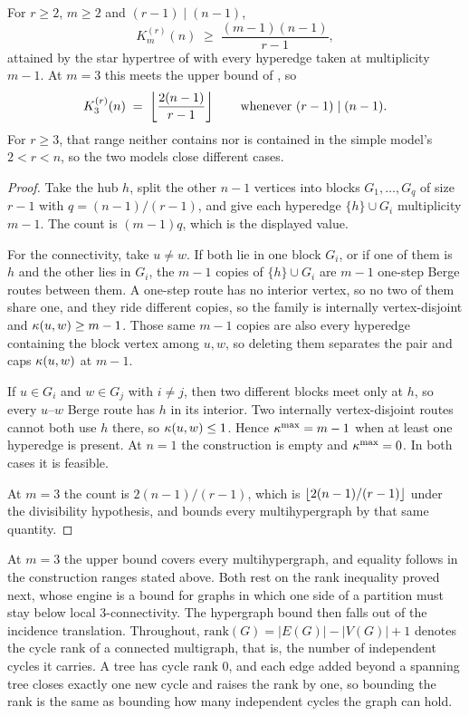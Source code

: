 \begin{proposition}\label{prop:hyper-vertex-lower-multi}
For $r \ge 2$, $m \ge 2$ and $(r-1) \mid (n-1)$,
\[
    K_m^{(r)}(n) \;\ge\; \frac{(m-1)(n-1)}{r-1},
\]
attained by the star hypertree of  with every hyperedge
taken at multiplicity $m-1$. At $m = 3$ this meets the upper bound of
, so
\[
    K_3^{(r)}(n) \;=\; \left\lfloor \frac{2(n-1)}{r-1} \right\rfloor
    \qquad\text{whenever } (r-1) \mid (n-1).
\]
For $r\ge3$, that range neither contains nor is contained in the simple model's
$2 < r < n$, so the two models close different cases.
\end{proposition}

\begin{proof}
Take the hub $h$, split the other $n-1$ vertices into blocks $G_1, \dots, G_q$ of
size $r-1$ with $q = (n-1)/(r-1)$, and give each hyperedge $\{h\} \cup G_i$
multiplicity $m-1$. The count is $(m-1)q$, which is the displayed value.

For the connectivity, take $u \ne w$. If both lie in one block $G_i$, or if one of
them is $h$ and the other lies in $G_i$, the $m-1$ copies of $\{h\} \cup G_i$ are
$m-1$ one-step Berge routes between them. A one-step route has no interior vertex,
so no two of them share one, and they ride different copies, so the family is
internally vertex-disjoint and $\kappa(u,w) \ge m-1$. Those same $m-1$ copies are
also every hyperedge containing the block vertex among $u, w$, so deleting them
separates the pair and  caps $\kappa(u,w)$ at $m-1$.

If $u \in G_i$ and $w \in G_j$ with $i \ne j$, then two different blocks meet only
at $h$, so every $u$--$w$ Berge route has $h$ in its interior. Two internally
vertex-disjoint routes cannot both use $h$ there, so $\kappa(u,w) \le 1$. Hence $\kappa^{\max}=m-1$ when at least one hyperedge is present. At $n=1$ the construction is empty and $\kappa^{\max}=0$. In both cases it is feasible.

At $m = 3$ the count is $2(n-1)/(r-1)$, which is $\left\lfloor 2(n-1)/(r-1) \right\rfloor$ under the
divisibility hypothesis, and  bounds every
multihypergraph by that same quantity.
\end{proof}

At $m=3$ the upper bound covers every multihypergraph, and equality follows in the construction ranges stated above. Both rest on the rank inequality proved next, whose engine is a bound for
graphs in which one side of a partition must stay below local
$3$-connectivity. The hypergraph bound then falls out of the incidence
translation. Throughout, $\mathrm{rank}(G) = |E(G)| - |V(G)| + 1$ denotes
the cycle rank of a connected multigraph, that is, the number of independent
cycles it carries. A tree has cycle rank $0$, and each edge added beyond a
spanning tree closes exactly one new cycle and raises the rank by one, so
bounding the rank is the same as bounding how many independent cycles the
graph can hold.

